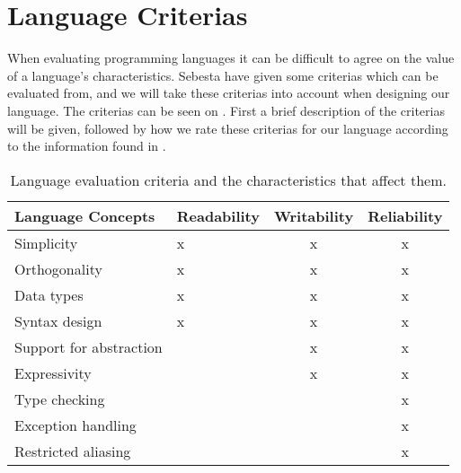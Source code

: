 \chapter{Language Criterias}
When evaluating programming languages it can be difficult to agree on the value of a language's characteristics.
Sebesta have given some criterias which can be evaluated from, and we will take these criterias into account when designing our language.\citep{Sebesta}
The criterias can be seen on .
First a brief description of the criterias will be given, followed by how we rate these criterias for our language according to the information found in .
\begin{table}[h]
	\centering
	\begin{tabular}{|l|l|c|c|}
	\hline
	\textbf{Language Concepts}										& \textbf{Readability}  & \textbf{Writability} & \textbf{Reliability}   \\ \hline
	Simplicity                                                  	& x 					& x             		 & x           			\\ \hline
	Orthogonality                                               	& x 					& x             		 & x           			\\ \hline
	Data types                                                  	& x 					& x             		 & x           			\\ \hline
	Syntax design                                               	& x 					& x             		 & x           			\\ \hline
	Support for abstraction                                    		&                       & x             		 & x           			\\ \hline
	Expressivity                                                	&                       & x             		 & x           			\\ \hline
	Type checking                                               	&                       &            			 & x           			\\ \hline
	Exception handling                                          	&                       &             			 & x           			\\ \hline
	Restricted aliasing                                         	&                       &             			 & x           			\\ \hline
	\end{tabular}
	\caption{Language evaluation criteria and the characteristics that affect them.}
	\label{tbl:concepts}
\end{table}

